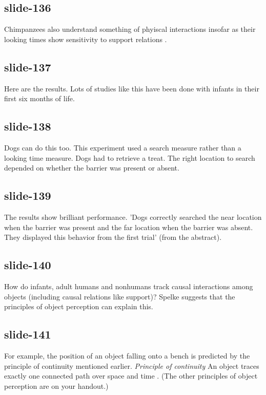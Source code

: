 \documentclass[12pt,\papersize]{extarticle}
\begin{document}
 
\subsection{slide-136}
Chimpanzees also understand something of phyiscal interactions insofar as their looking times show sensitivity to support relations \citep{cacchione:2004_recognizing}.
 
 
\subsection{slide-137}
Here are the results.
Lots of studies like this have been done with infants in their first six months of life.
 
 
\subsection{slide-138}
Dogs can do this too.
This experiment used a search measure rather than a looking time measure.
Dogs had to retrieve a treat. The right location to search depended on whether the barrier was present or absent.
 
 
\subsection{slide-139}
The results show brilliant performance.
'Dogs correctly searched the near location when the barrier was present and the far location when the barrier was absent. They displayed this behavior from the first trial' \citep{kundey:2010_domesticated} (from the abstract).
 
 
\subsection{slide-140}
How do infants, adult humans and nonhumans track causal interactions among objects (including causal relations like support)?
Spelke suggests that the principles of object perception can explain this.
 
 
\subsection{slide-141}
For example, the position of an object falling onto a bench is predicted by the principle of continuity mentioned earlier.
\emph{Principle of continuity} An object traces exactly one connected path over space and time \citep[p.\ 113]{spelke:1995_spatiotemporal}.
(The other principles of object perception are on your handout.)
 
\end{document}
